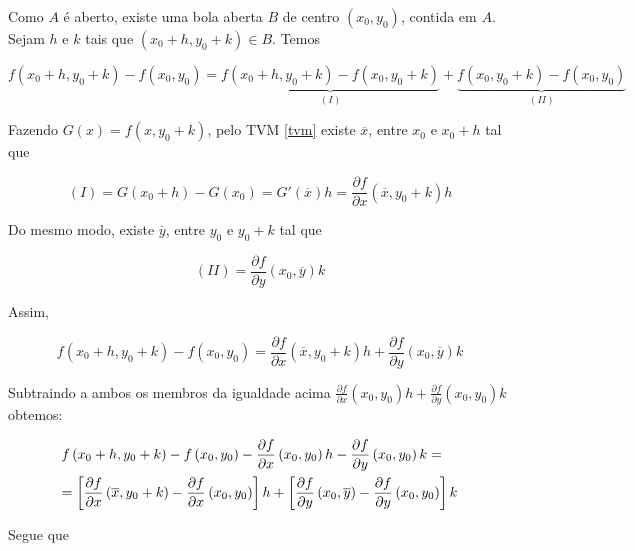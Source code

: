 \documentclass[11pt, oneside, a4paper]{gsm-l}
\begin{document}
\begin{dem}
    Como $A$ é aberto, existe uma bola aberta $B$ de centro $\left( {x_0 ,y_0 } \right)$, contida em $A$. Sejam $h$ e $k$ tais que $\left( {x_0  + h,y_0  + k} \right) \in B$. Temos

\[
\scriptstyle{f\left( {x_0  + h,y_0  + k} \right) - f\left( {x_0 ,y_0 } \right) = \underbrace {f\left( {x_0  + h,y_0  + k} \right) - f\left( {x_0 ,y_0  + k} \right)}_{\left( I \right)} + \underbrace {f\left( {x_0 ,y_0  + k} \right) - f\left( {x_0 ,y_0 } \right)}_{\left( {II} \right)}}
\]

    Fazendo $G\left( x \right) = f\left( {x,y_0  + k} \right)$, pelo TVM \ref{tvm} existe $\overline x$, entre $x_0$ e $x_0 + h$ tal que

\[
\left( I \right) = G\left( {x_0  + h} \right) - G\left( {x_0 } \right) = G'\left( {\overline x } \right)h = \frac{{\partial f}}
{{\partial x}}\left( {\overline x ,y_0  + k} \right)h
\]

Do mesmo modo, existe $\overline y$, entre $y_0$ e $y_0 + k$ tal que

\[
    \left( {II} \right) = \frac{{\partial f}}{{\partial y}}\left( {x_0 ,\overline y } \right)k
\]

Assim,

\[
f\left( {x_0  + h,y_0  + k} \right) - f\left( {x_0 ,y_0 } \right) = \frac{{\partial f}}
{{\partial x}}\left( {\overline x ,y_0  + k} \right)h + \frac{{\partial f}}
{{\partial y}}\left( {x_0 ,\overline y } \right)k
\]

    Subtraindo a ambos os membros da igualdade acima $\frac{{\partial f}}{{\partial x}}\left( {x_0 ,y_0 } \right)h + \frac{{\partial f}}{{\partial y}}\left( {x_0 ,y_0 } \right)k$ obtemos:

\[
\begin{gathered}
  f\left( {x_0  + h,y_0  + k} \right) - f\left( {x_0 ,y_0 } \right) - \frac{{\partial f}}
{{\partial x}}\left( {x_0 ,y_0 } \right)h - \frac{{\partial f}}
{{\partial y}}\left( {x_0 ,y_0 } \right)k =  \hfill \\
= \left[ {\frac{{\partial f}}
{{\partial x}}\left( {\overline x ,y_0  + k} \right) - \frac{{\partial f}}
{{\partial x}}\left( {x_0 ,y_0 } \right)} \right]h + \left[ {\frac{{\partial f}}
{{\partial y}}\left( {x_0 ,\overline y } \right) - \frac{{\partial f}}
{{\partial y}}\left( {x_0 ,y_0 } \right)} \right]k \hfill \\
\end{gathered}
\]

Segue que


\end{dem}
\end{document}
